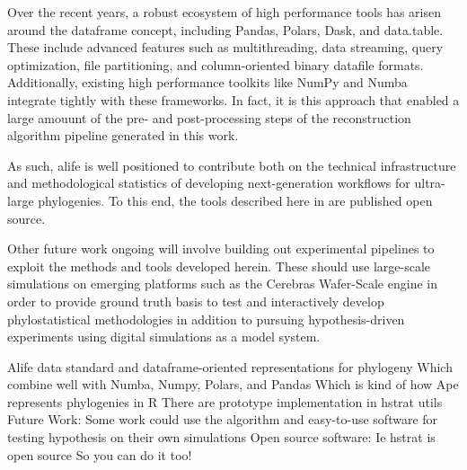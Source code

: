 Over the recent years, a robust ecosystem of high performance tools has arisen around the dataframe concept, including Pandas, Polars, Dask, and data.table.
These include advanced features such as multithreading, data streaming, query optimization, file partitioning, and column-oriented binary datafile formats.
Additionally, existing high performance toolkits like NumPy and Numba integrate tightly with these frameworks.
In fact, it is this approach that enabled a large amouunt of the pre- and post-processing steps of the reconstruction algorithm pipeline generated in this work.

As such, alife is well positioned to contribute both on the technical infrastructure and methodological statistics of developing next-generation workflows for ultra-large phylogenies.
To this end, the tools described here in are published open source.

Other future work ongoing will involve building out experimental pipelines to exploit the methods and tools developed herein.
These should use large-scale simulations on emerging platforms such as the Cerebras Wafer-Scale engine in order to provide ground truth basis to test and interactively develop phylostatistical methodologies in addition to pursuing hypothesis-driven experiments using digital simulations as a model system.

Alife data standard and dataframe-oriented representations for phylogeny
Which combine well with Numba, Numpy, Polars, and Pandas
Which is kind of how Ape represents phylogenies in R
There are prototype implementation in hstrat utils
Future Work:
Some work could use the algorithm and easy-to-use software for testing hypothesis on their own simulations
Open source software:
Ie hstrat is open source
So you can do it too!

